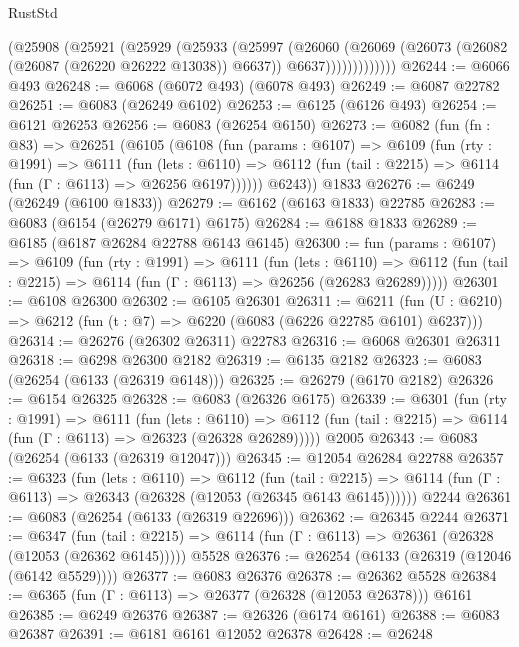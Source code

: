 \begin{lexlean}{RustStd}
\begin{coremodule}
                (@25908
                  (@25921
                    (@25929
                      (@25933
                        (@25997
                          (@26060
                            (@26069
                              (@26073 (@26082 (@26087 (@26220 @26222 @13038)) @6637))
                              @6637)))))))))))))
@26244 := @6066 @493
@26248 := @6068 (@6072 @493) (@6078 @493)
@26249 := @6087 @22782
@26251 := @6083 (@26249 @6102)
@26253 := @6125 (@6126 @493)
@26254 := @6121 @26253
@26256 := @6083 (@26254 @6150)
@26273 := @6082
    (fun (fn : @83) =>
    @26251
      (@6105
        (@6108
          (fun (params : @6107) =>
          @6109
            (fun (rty : @1991) =>
            @6111
              (fun (lets : @6110) =>
              @6112 (fun (tail : @2215) => @6114 (fun (Γ : @6113) => @26256 @6197))))))
        @6243))
    @1833
@26276 := @6249 (@26249 (@6100 @1833))
@26279 := @6162 (@6163 @1833) @22785
@26283 := @6083 (@6154 (@26279 @6171) @6175)
@26284 := @6188 @1833
@26289 := @6185 (@6187 @26284 @22788 @6143 @6145)
@26300 := fun (params : @6107) =>
  @6109
    (fun (rty : @1991) =>
    @6111
      (fun (lets : @6110) =>
      @6112 (fun (tail : @2215) => @6114 (fun (Γ : @6113) => @26256 (@26283 @26289)))))
@26301 := @6108 @26300
@26302 := @6105 @26301
@26311 := @6211
    (fun (U : @6210) => @6212 (fun (t : @7) => @6220 (@6083 (@6226 @22785 @6101) @6237)))
@26314 := @26276 (@26302 @26311) @22783
@26316 := @6068 @26301 @26311
@26318 := @6298 @26300 @2182
@26319 := @6135 @2182
@26323 := @6083 (@26254 (@6133 (@26319 @6148)))
@26325 := @26279 (@6170 @2182)
@26326 := @6154 @26325
@26328 := @6083 (@26326 @6175)
@26339 := @6301
    (fun (rty : @1991) =>
    @6111
      (fun (lets : @6110) =>
      @6112 (fun (tail : @2215) => @6114 (fun (Γ : @6113) => @26323 (@26328 @26289)))))
    @2005
@26343 := @6083 (@26254 (@6133 (@26319 @12047)))
@26345 := @12054 @26284 @22788
@26357 := @6323
    (fun (lets : @6110) =>
    @6112
      (fun (tail : @2215) =>
      @6114 (fun (Γ : @6113) => @26343 (@26328 (@12053 (@26345 @6143 @6145))))))
    @2244
@26361 := @6083 (@26254 (@6133 (@26319 @22696)))
@26362 := @26345 @2244
@26371 := @6347
    (fun (tail : @2215) => @6114 (fun (Γ : @6113) => @26361 (@26328 (@12053 (@26362 @6145)))))
    @5528
@26376 := @26254 (@6133 (@26319 (@12046 (@6142 @5529))))
@26377 := @6083 @26376
@26378 := @26362 @5528
@26384 := @6365 (fun (Γ : @6113) => @26377 (@26328 (@12053 @26378))) @6161
@26385 := @6249 @26376
@26387 := @26326 (@6174 @6161)
@26388 := @6083 @26387
@26391 := @6181 @6161 @12052 @26378
@26428 := @26248

\end{coremodule}
\end{lexlean}
